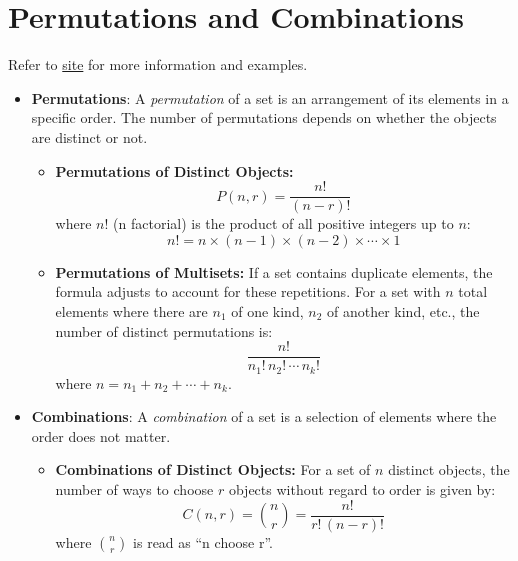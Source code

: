 \section{Permutations and Combinations}

Refer to \href{https://mathsisfun.com/combinatorics/combinations-permutations.html}{site} for more information and examples.

\begin{itemize}
    \item \textbf{Permutations}: A \textit{permutation} of a set is an arrangement of its elements in a specific order. The number of permutations depends on whether the objects are distinct or not.
        
    \begin{itemize}
        \item \textbf{Permutations of Distinct Objects:}
        \begin{equation} \label{permutation no repetition}
            P(n, r) = \frac{n!}{(n - r)!}
        \end{equation}
        where \( n! \) (n factorial) is the product of all positive integers up to \( n \):
        \begin{equation}
            n! = n \times (n - 1) \times (n - 2) \times \cdots \times 1
        \end{equation}
        
        \item \textbf{Permutations of Multisets:}
        If a set contains duplicate elements, the formula adjusts to account for these repetitions. For a set with \( n \) total elements where there are \( n_1 \) of one kind, \( n_2 \) of another kind, etc., the number of distinct permutations is:
        \begin{equation}
            \frac{n!}{n_1! \, n_2! \, \cdots \, n_k!}
        \end{equation}
        where \( n = n_1 + n_2 + \cdots + n_k \).
    \end{itemize}

    \item \textbf{Combinations}: A \textit{combination} of a set is a selection of elements where the order does not matter.
    \begin{itemize}
        
        \item \textbf{Combinations of Distinct Objects:}
        For a set of \( n \) distinct objects, the number of ways to choose \( r \) objects without regard to order is given by:
        \begin{equation}
            C(n, r) = \binom{n}{r} = \frac{n!}{r! \, (n - r)!}
        \end{equation}
        where \( \binom{n}{r} \) is read as ``n choose r''.
        

\end{itemize}
\end{itemize}
